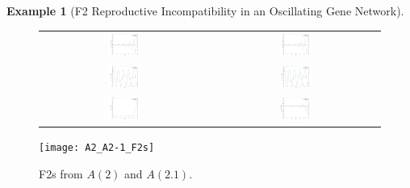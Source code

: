 \documentclass[9 pt]{article}
\newcommand{\1}{\mathbbm{1}}
\newtheorem{example}{Example}
\begin{document}
\begin{multicols}{2}
\begin{example}[F2 Reproductive Incompatibility in an Oscillating Gene Network]
        \begin{figure}[H]
          \begin{tabular}{cc}
            \includegraphics[width=0.2\textwidth]{A2_A3_osci_F2_hyb_1}
            & \includegraphics[width=0.2\textwidth]{A2_A3_osci_F2_hyb_2}
           \\ \includegraphics[width=0.2\textwidth]{A2_A3_osci_F2_hyb_3}
            & \includegraphics[width=0.2\textwidth]{A2_A3_osci_F2_hyb_4}
            \\ \includegraphics[width=0.2\textwidth]{A2_A3_osci_F2_hyb_5}
            & \includegraphics[width=0.2\textwidth]{A2_A3_osci_F2_hyb_6}
          \end{tabular}
        \end{figure}
      \end{example}

      \begin{figure}[H]
        \centering
        \texttt{[image: A2\_A2-1\_F2s]}
        \caption{F2s from $A(2)$ and $A(2.1)$.}
      \end{figure}


\end{multicols}
\end{document}
